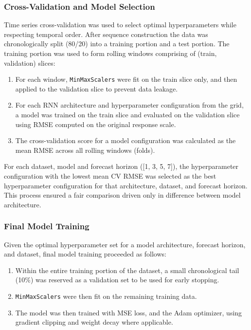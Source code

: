 \documentclass[conference]{IEEEtran}
\begin{document}
\subsubsection{\textbf{Cross-Validation and Model Selection}}
Time series cross-validation was used to select optimal hyperparameters while respecting temporal order. After sequence construction the data was chronologically split (80/20) into a training portion and a test portion. The training portion was used to form rolling windows comprising of (train, validation) slices:
\begin{enumerate}
    \item For each window, \texttt{MinMaxScalers} were fit on the train slice only, and then applied to the validation slice to prevent data leakage.
    \item For each RNN architecture and hyperparameter configuration from the grid, a model was trained on the train slice and evaluated on the validation slice using RMSE computed on the original response scale.
    \item The cross-validation score for a model configuration was calculated as the mean RMSE across all rolling windows (folds).
\end{enumerate}
For each dataset, model and forecast horizon ([1, 3, 5, 7]), the hyperparameter configuration with the lowest mean CV RMSE was selected as the best hyperparameter configuration for that architecture, dataset, and forecast horizon. This process ensured a fair comparison driven only in difference between model architecture.

\subsubsection{\textbf{Final Model Training}}
Given the optimal hyperparameter set for a model architecture, forecast horizon, and dataset, final model training proceeded as follows:
\begin{enumerate}
    \item Within the entire training portion of the dataset, a small chronological tail (10\%) was reserved as a validation set to be used for early stopping.
    \item \texttt{MinMaxScalers} were then fit on the remaining training data.
    \item The model was then trained with MSE loss, and the Adam optimizer, using gradient clipping and weight decay where applicable.
\end{enumerate}
\end{document}
